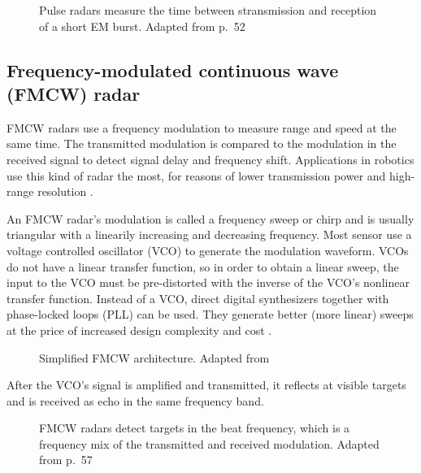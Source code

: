 \begin{figure}[htp]
    \centering
    \label{fig:radar_pulse}
    \def\svgwidth{\linewidth}
    
    \caption{Pulse radars measure the time between stransmission and reception of a short EM burst. Adapted from \cite{Adams2012} p.~52}
\end{figure}


\subsection{Frequency-modulated continuous wave (FMCW)
radar}\label{frequency-modulated-continuous-wave-fmcw-radar}

FMCW radars use a frequency modulation to measure range and speed at the
same time. The transmitted modulation is compared to the modulation in
the received signal to detect signal delay and frequency shift.
Applications in robotics use this kind of radar the most, for reasons of
lower transmission power and high-range resolution \cite{Adams2012}.

An FMCW radar's modulation is called a frequency sweep or chirp and is
usually triangular with a linearily increasing and decreasing frequency.
Most sensor use a voltage controlled oscillator (VCO) to generate the
modulation waveform. VCOs do not have a linear transfer function, so in
order to obtain a linear sweep, the input to the VCO must be
pre-distorted with the inverse of the VCO's nonlinear transfer function.
Instead of a VCO, direct digital synthesizers together with phase-locked
loops (PLL) can be used. They generate better (more linear) sweeps at
the price of increased design complexity and cost \cite{Ernst2016}.

\begin{figure}[htp]
    \centering
    \label{fig:fmcw_blocks}
    \def\svgwidth{\linewidth}
    
    \caption{Simplified FMCW architecture. Adapted from \cite{VanZeijl2014}}
\end{figure}

After the VCO's signal is amplified and transmitted, it reflects at
visible targets and is received as echo in the same frequency band.

\begin{figure}[htp]
    \centering
    \label{fig:fmcw_triangular}
    \def\svgwidth{\linewidth}
    
    \caption{FMCW radars detect targets in the beat frequency, which is a frequency mix of the transmitted and received modulation. Adapted from \cite{Adams2012} p.~57}
\end{figure}

